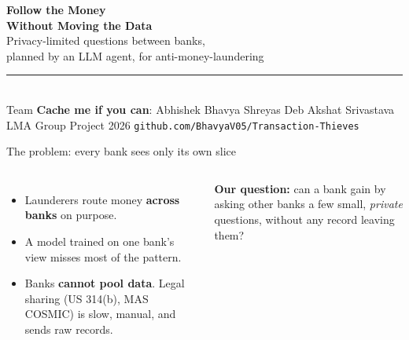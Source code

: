 \documentclass[aspectratio=169,11pt]{beamer}
\begin{document}
{
\begin{frame}
\vspace{1.2cm}
{\fontsize{28}{32}\selectfont\bfseries Follow the Money\\[4pt] Without Moving the Data}\\[10pt]
{\color{teal}\large Privacy-limited questions between banks,\\ planned by an LLM agent, for anti-money-laundering}\\[16pt]
{\color{accent}\rule{4cm}{2pt}}\\[8pt]
Team \textbf{Cache me if you can}: Abhishek \textperiodcentered{} Bhavya \textperiodcentered{} Shreyas Deb \textperiodcentered{} Akshat Srivastava\\
{\small LMA Group Project 2026 \quad\textperiodcentered\quad \texttt{github.com/BhavyaV05/Transaction-Thieves}}
\end{frame}}

\begin{frame}{The problem: every bank sees only its own slice}
\begin{columns}[c]
\begin{itemize}
\item Launderers route money \textbf{across banks} on purpose.
\item A model trained on one bank's view misses most of the pattern.
\item Banks \textbf{cannot pool data}. Legal sharing (US 314(b), MAS COSMIC) is slow, manual, and sends raw records.
\end{itemize}
\vspace{6pt}
\alert{\textbf{Our question:}} can a bank gain by asking other banks a few small, \emph{private} questions, without any record leaving them?
\centering
{}
\end{columns}
\end{frame}
\end{document}
